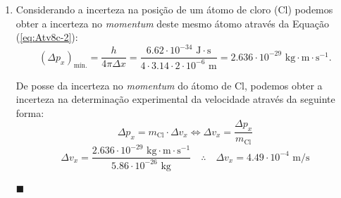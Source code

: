 \documentclass[12pt,a4paper]{article}
\begin{document}
\begin{enumerate}[label = \alph*)]
        \item Considerando a incerteza na posição de um átomo de cloro (Cl) podemos obter a incerteza no \textit{momentum} deste mesmo átomo através da Equação (\ref{eq:Atv8c-2}):
        \begin{equation}\label{eq:Atv8e-1}
            \left(\Delta p_x\right)_{\text{mín.}}=\frac{h}{4\pi\Delta x}=\frac{6.62\cdot10^{-34}\text{ J}\cdot\text{s}}{4\cdot3.14\cdot2\cdot10^{-6}\text{ m}}=2.636\cdot10^{-29}\text{ kg}\cdot\text{m}\cdot\text{s}^{-1}.
        \end{equation}

        De posse da incerteza no \textit{momentum} do átomo de Cl, podemos obter a incerteza na determinação experimental da velocidade através da seguinte forma:
        \begin{equation*}
            \Delta p_x=m_{\text{Cl}}\cdot\Delta v_x\iff\Delta v_x=\frac{\Delta p_x}{m_{\text{Cl}}}
        \end{equation*}
        \begin{equation}\label{eq:Atv8e-2}
            \Delta v_x=\frac{2.636\cdot10^{-29}\text{ kg}\cdot\text{m}\cdot\text{s}^{-1}}{5.86\cdot10^{-26}\text{ kg}}\quad\therefore\quad\boxed{\Delta v_x=4.49\cdot10^{-4}\text{ m/s}}
        \end{equation}
        \begin{flushright}
            $\blacksquare$    
        \end{flushright}

        
    \end{enumerate}



\noindent\makebox[\linewidth]{\rule{\paperwidth}{0.4pt}}
\newpage
\end{document}
